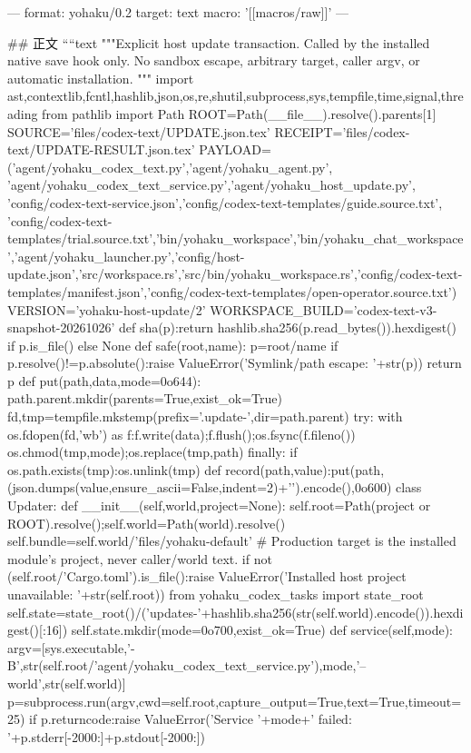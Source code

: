 ---
format: yohaku/0.2
target: text
macro: '[[macros/raw]]'
---

## 正文
````text
"""Explicit host update transaction. Called by the installed native save hook only.
No sandbox escape, arbitrary target, caller argv, or automatic installation.
"""
import ast,contextlib,fcntl,hashlib,json,os,re,shutil,subprocess,sys,tempfile,time,signal,threading
from pathlib import Path
ROOT=Path(__file__).resolve().parents[1]
SOURCE='files/codex-text/UPDATE.json.tex'
RECEIPT='files/codex-text/UPDATE-RESULT.json.tex'
PAYLOAD=('agent/yohaku_codex_text.py','agent/yohaku_agent.py',
 'agent/yohaku_codex_text_service.py','agent/yohaku_host_update.py',
 'config/codex-text-service.json','config/codex-text-templates/guide.source.txt',
 'config/codex-text-templates/trial.source.txt','bin/yohaku_workspace','bin/yohaku_chat_workspace','agent/yohaku_launcher.py','config/host-update.json','src/workspace.rs','src/bin/yohaku_workspace.rs','config/codex-text-templates/manifest.json','config/codex-text-templates/open-operator.source.txt')
VERSION='yohaku-host-update/2'
WORKSPACE_BUILD='codex-text-v3-snapshot-20261026'
def sha(p):return hashlib.sha256(p.read_bytes()).hexdigest() if p.is_file() else None
def safe(root,name):
 p=root/name
 if p.resolve()!=p.absolute():raise ValueError('Symlink/path escape: '+str(p))
 return p
def put(path,data,mode=0o644):
 path.parent.mkdir(parents=True,exist_ok=True)
 fd,tmp=tempfile.mkstemp(prefix='.update-',dir=path.parent)
 try:
  with os.fdopen(fd,'wb') as f:f.write(data);f.flush();os.fsync(f.fileno())
  os.chmod(tmp,mode);os.replace(tmp,path)
 finally:
  if os.path.exists(tmp):os.unlink(tmp)
def record(path,value):put(path,(json.dumps(value,ensure_ascii=False,indent=2)+'\n').encode(),0o600)
class Updater:
 def __init__(self,world,project=None):
  self.root=Path(project or ROOT).resolve();self.world=Path(world).resolve()
  self.bundle=self.world/'files/yohaku-default'
  # Production target is the installed module's project, never caller/world text.
  if not (self.root/'Cargo.toml').is_file():raise ValueError('Installed host project unavailable: '+str(self.root))
  from yohaku_codex_tasks import state_root
  self.state=state_root()/('updates-'+hashlib.sha256(str(self.world).encode()).hexdigest()[:16])
  self.state.mkdir(mode=0o700,exist_ok=True)
 def service(self,mode):
  argv=[sys.executable,'-B',str(self.root/'agent/yohaku_codex_text_service.py'),mode,'--world',str(self.world)]
  p=subprocess.run(argv,cwd=self.root,capture_output=True,text=True,timeout=25)
  if p.returncode:raise ValueError('Service '+mode+' failed: '+p.stderr[-2000:]+p.stdout[-2000:])
